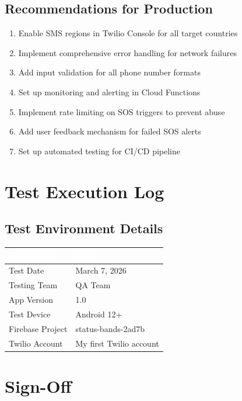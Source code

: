 \documentclass[12pt,a4paper]{article}
\begin{document}
\subsection{Recommendations for Production}
\begin{enumerate}
    \item Enable SMS regions in Twilio Console for all target countries
    \item Implement comprehensive error handling for network failures
    \item Add input validation for all phone number formats
    \item Set up monitoring and alerting in Cloud Functions
    \item Implement rate limiting on SOS triggers to prevent abuse
    \item Add user feedback mechanism for failed SOS alerts
    \item Set up automated testing for CI/CD pipeline
\end{enumerate}

\newpage

\section{Test Execution Log}

\subsection{Test Environment Details}
\begin{table}[h]
\centering
\setlength{\extrarowheight}{10pt}
\begin{tabularx}{\textwidth}{|l|X|}
\hline
\rowcolor{headercolor}
\textcolor{white}{\textbf{Parameter}} & \textcolor{white}{\textbf{Value}} \\
\hline
Test Date & March 7, 2026 \\
\hline
Testing Team & QA Team \\
\hline
App Version & 1.0 \\
\hline
Test Device & Android 12+ \\
\hline
Firebase Project & status-bands-2ad7b \\
\hline
Twilio Account & My first Twilio account \\
\hline
\end{tabularx}
\end{table}

\section*{Sign-Off}
\end{document}
